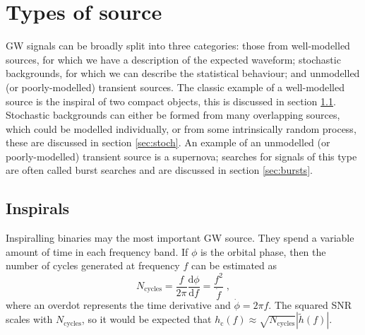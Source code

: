 \section{Types of source}\label{sec:voc}

GW signals can be broadly split into three categories: those from well-modelled sources, for which we have a description of the expected waveform; stochastic backgrounds, for which we can describe the statistical behaviour; and unmodelled (or poorly-modelled) transient sources. The classic example of a well-modelled source is the inspiral of two compact objects, this is discussed in section \ref{sec:insp}. Stochastic backgrounds can either be formed from many overlapping sources, which could be modelled individually, or from some intrinsically random process, these are discussed in section \ref{sec:stoch}. An example of an unmodelled (or poorly-modelled) transient source is a supernova; searches for signals of this type are often called burst searches and are discussed in section \ref{sec:bursts}.

\subsection{Inspirals}\label{sec:insp}

Inspiralling binaries may the most important GW source. They spend a variable amount of time in each frequency band. If $\phi$ is the orbital phase, then the number of cycles generated at frequency $f$ can be estimated as
\begin{equation}\label{eq:inspiral}
{N}_{\mathrm{cycles}} = \frac{f}{2\pi} \frac{\mathrm{d}\phi}{\mathrm{d}f} = \frac{f^{2}}{\dot{f}} \; ,
\end{equation}
where an overdot represents the time derivative and $\dot{\phi} = 2\pi f$. The squared SNR scales with ${N}_{\mathrm{cycles}}$, so it would be expected that $h_\mathrm{c}(f)\approx \sqrt{{N}_{\mathrm{cycles}}}\left|\tilde{h}(f)\right|$.

